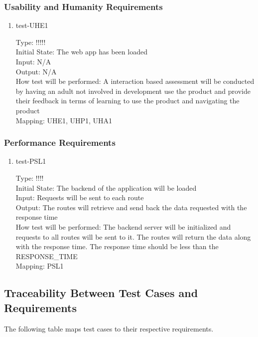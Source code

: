 \documentclass[12pt, titlepage]{article}
\begin{document}
\subsubsection{Usability and Humanity Requirements}

\begin{enumerate}
\item{test-UHE1\\}

Type: !!!!!\\
Initial State: The web app has been loaded\\
Input: N/A\\
Output: N/A\\
How test will be performed: A interaction based assessment will be conducted by having an adult not involved in development use the product and provide their feedback in terms of learning to use the product and navigating the product\\
Mapping: UHE1, UHP1, UHA1
\end{enumerate}

\subsubsection{Performance Requirements}

\begin{enumerate}
\item{test-PSL1\\}

Type: !!!!\\
Initial State: The backend of the application will be loaded\\
Input: Requests will be sent to each route\\
Output: The routes will retrieve and send back the data requested with the response time\\
How test will be performed: The backend server will be initialized and requests to all routes will be sent to it. The routes will return the data along with the response time. The response time should be less than the RESPONSE\_TIME\\
Mapping: PSL1

\end{enumerate}

\subsection{Traceability Between Test Cases and Requirements}

The following table maps test cases to their respective requirements.
\end{document}
